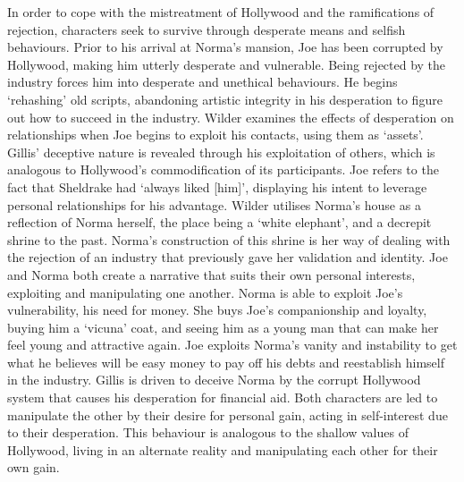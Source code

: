 \documentclass[a4paper]{article}
\begin{document}
In order to cope with the mistreatment of Hollywood and the ramifications of rejection,
characters seek to survive through desperate means and selfish behaviours. Prior to his
arrival at Norma’s mansion, Joe has been corrupted by Hollywood, making him utterly
desperate and vulnerable. Being rejected by the industry forces him into desperate and
unethical behaviours. He begins ‘rehashing’ old scripts, abandoning artistic integrity in his
desperation to figure out how to succeed in the industry. Wilder examines the effects of
desperation on relationships when Joe begins to exploit his contacts, using them as ‘assets’.
Gillis' deceptive nature is revealed through his exploitation of others, which is analogous to
Hollywood's commodification of its participants. Joe refers to the fact that Sheldrake had
‘always liked [him]’, displaying his intent to leverage personal relationships for his
advantage. Wilder utilises Norma’s house as a reflection of Norma herself, the place being a
‘white elephant’, and a decrepit shrine to the past. Norma’s construction of this shrine is
her way of dealing with the rejection of an industry that previously gave her validation and
identity. Joe and Norma both create a narrative that suits their own personal interests,
exploiting and manipulating one another. Norma is able to exploit Joe’s vulnerability, his
need for money. She buys Joe’s companionship and loyalty, buying him a ‘vicuna’ coat, and
seeing him as a young man that can make her feel young and attractive again. Joe exploits
Norma’s vanity and instability to get what he believes will be easy money to pay off his
debts and reestablish himself in the industry. Gillis is driven to deceive Norma by the
corrupt Hollywood system that causes his desperation for financial aid. Both characters are led to manipulate the other by their desire for personal gain, acting in self-interest due to
their desperation. This behaviour is analogous to the shallow values of Hollywood, living in
an alternate reality and manipulating each other for their own gain.\\
\end{document}
